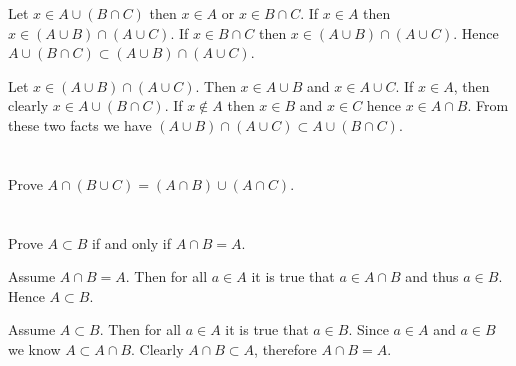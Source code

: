 \documentclass[a4paper]{article}
\begin{document}
Let $x \in A \cup (B \cap C)$ then $x \in A$ or $x \in B \cap C$. If $x \in A$ then $x \in (A \cup B) \cap (A \cup C)$. If $x \in B \cap C$ then $x \in (A \cup B) \cap (A \cup C)$. Hence $A \cup (B \cap C) \subset (A \cup B) \cap (A \cup C)$. 

\vspace{\baselineskip}

Let $x \in (A \cup B) \cap (A \cup C)$. Then $x \in A \cup B$ and $x \in A \cup C$. If $x \in A$, then clearly $x \in A \cup (B \cap C)$. If $x \not\in A$ then $x \in B$ and $x \in C$ hence $x \in A \cap B$. From these two facts we have  $(A \cup B) \cap (A \cup C) \subset A \cup (B \cap C)$.


\section{}

Prove $A \cap (B \cup C) = (A \cap B) \cup (A \cap C)$.


\section{}

Prove $A \subset B$ if and only if $A \cap B = A$.

\vspace{\baselineskip}

Assume $A \cap B = A$. Then  for all $a \in A$ it is true that $a \in A \cap B$ and thus $a \in B$. Hence $A \subset B$.

\vspace{\baselineskip}

Assume $A \subset B$. Then for all $a \in A$ it is true that $a \in B$. Since $a \in A$ and $a \in B$ we know $A \subset A \cap B$. Clearly $A \cap B \subset A$, therefore $A \cap B = A$.

\section{}


\section{}


\section{}


\section{}
\end{document}
